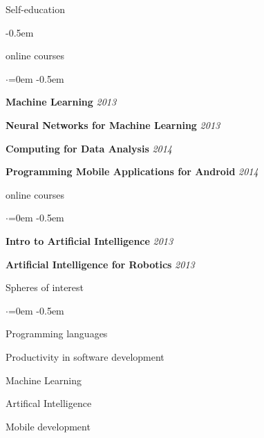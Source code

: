 \documentclass{resume} %
\begin{document}
\begin{rSection}{Self-education}

\begin{description} \itemsep -0.5em \vspace{-0.5em}
  \item[Coursera] \hfill {online courses}
  \begin{list}{$\cdot$}{\leftmargin=0em} %
    \itemsep -0.5em \vspace{-0.5em} %
    \item {\bf Machine Learning} \hfill {\em 2013}
    \item {\bf Neural Networks for Machine Learning} \hfill {\em  2013}
    \item {\bf Computing for Data Analysis} \hfill {\em  2014}
    \item {\bf Programming Mobile Applications for Android} \hfill {\em  2014}
  \end{list}
  \item[Udacity] \hfill {online courses}
  \begin{list}{$\cdot$}{\leftmargin=0em} %
    \itemsep -0.5em \vspace{-0.5em} %
    \item {\bf Intro to Artificial Intelligence} \hfill {\em  2013}
    \item {\bf Artificial Intelligence for Robotics} \hfill {\em  2013}
  \end{list}
\end{description}

\end{rSection}


\begin{rSection}{Spheres of interest}
  \smallskip
  \begin{list}{$\cdot$}{\leftmargin=0em} %
    \itemsep -0.5em \vspace{-0.5em} %
  \item Programming languages
  \item Productivity in software development
  \item Machine Learning
  \item Artifical Intelligence
  \item Mobile development
  \end{list}
\end{rSection}
\end{document}

